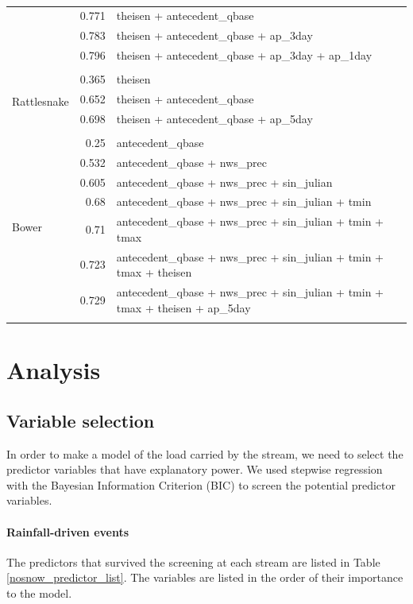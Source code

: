 \documentclass[10pt]{article}
\begin{document}
\begin{table}[h]
\begin{center}
\begin{tabular}{lrl}
 & 0.771 & theisen + antecedent\_qbase\\ 
 & 0.783 & theisen + antecedent\_qbase + ap\_3day\\ 
 & 0.796 & theisen + antecedent\_qbase + ap\_3day + ap\_1day\\ 
\vspace{2mm}\\ \multirow{4}{*}{Rattlesnake} & 0.365 & theisen\\ 
 & 0.652 & theisen + antecedent\_qbase\\ 
 & 0.698 & theisen + antecedent\_qbase + ap\_5day\\ 
\vspace{2mm}\\ \multirow{8}{*}{Bower} & 0.25 & antecedent\_qbase\\ 
 & 0.532 & antecedent\_qbase + nws\_prec\\ 
 & 0.605 & antecedent\_qbase + nws\_prec + sin\_julian\\ 
 & 0.68 & antecedent\_qbase + nws\_prec + sin\_julian + tmin\\ 
 & 0.71 & antecedent\_qbase + nws\_prec + sin\_julian + tmin + tmax\\ 
 & 0.723 & antecedent\_qbase + nws\_prec + sin\_julian + tmin + tmax + theisen\\ 
 & 0.729 & antecedent\_qbase + nws\_prec + sin\_julian + tmin + tmax + theisen + ap\_5day\\ 
\vspace{2mm}\\     \end{tabular}
    \caption{\label{phos_r_square_nosnow}}
    \end{center}
\end{table}


\section{Analysis}

\subsection{Variable selection}
In order to make a model of the load carried by the stream, we need to select the predictor variables that have explanatory power. We used stepwise regression with the Bayesian Information Criterion (BIC) to screen the potential predictor variables.

\paragraph{Rainfall-driven events} The predictors that survived the screening at each stream are listed in Table \ref{nosnow_predictor_list}. The variables are listed in the order of their importance to the model.\\
\end{document}
